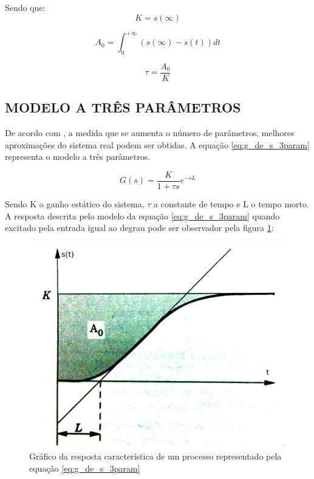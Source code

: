 \documentclass[12pt,oneside,a4paper, chapter=TITLE, section = TITLE, english, brazil]{abntex2}
\begin{document}
Sendo que:
\begin{equation}
K = s(\infty) \label{eq:k_mod_2_param}
\end{equation}

\begin{equation}
A_{0} = \int^{+\infty}_0 (s(\infty) - s(t))dt \label{eq:tau_mod_2_param_1}
\end{equation}

\begin{equation}
\tau = \frac{A_{0}}{K} \label{eq:tau_mod_2_param_2}
\end{equation}

\subsection{MODELO A TRÊS PARÂMETROS}

De acordo com , a medida que se aumenta o número de parâmetros, melhores aproximações do sistema real podem ser obtidas. A equação \ref{eq:g_de_s_3param} representa o modelo a três parâmetros.

\begin{equation}
G(s) = \frac{K}{1 + \tau s}e^{-sL} \label{eq:g_de_s_3param}
\end{equation}

Sendo K o ganho estático do sistema, $\tau$ a constante de tempo e L o tempo morto. A resposta descrita pelo modelo da equação \ref{eq:g_de_s_3param} quando excitado pela entrada igual ao degrau pode ser observador pela figura \ref{fig:resp_g_de_s_3param}:

\begin{figure}[h] %
\centering
\includegraphics[scale=0.27]{./imagens/resp_g3}
\caption[Gráfico da resposta característica de um processo representado pela equação \ref{eq:g_de_s_3param}]{Gráfico da resposta característica de um processo representado pela equação \ref{eq:g_de_s_3param} \cite{astrom}}
\label{fig:resp_g_de_s_3param}
\end{figure}
\end{document}
